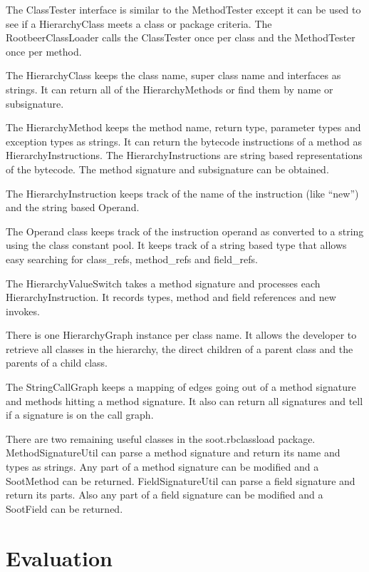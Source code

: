 \documentclass[preprint]{sigplanconf}
\begin{document}
The ClassTester interface is similar to the MethodTester except it can be used to see if a HierarchyClass meets a class or package criteria. The RootbeerClassLoader calls the ClassTester once per class and the MethodTester once per method.

The HierarchyClass keeps the class name, super class name and interfaces as strings. It can return all of the HierarchyMethods or find them by name or subsignature.

The HierarchyMethod keeps the method name, return type, parameter types and exception types as strings. It can return the bytecode instructions of a method as HierarchyInstructions. The HierarchyInstructions are string based representations of the bytecode. The method signature and subsignature can be obtained.

The HierarchyInstruction keeps track of the name of the instruction (like “new”) and the string based Operand.

The Operand class keeps track of the instruction operand as converted to a string using the class constant pool. It keeps track of a string based type that allows easy searching for class\_refs, method\_refs and field\_refs.

The HierarchyValueSwitch takes a method signature and processes each HierarchyInstruction. It records types, method and field references and new invokes.

There is one HierarchyGraph instance per class name. It allows the developer to retrieve all classes in the hierarchy, the direct children of a parent class and the parents of a child class. 


The StringCallGraph keeps a mapping of edges going out of a method signature and methods hitting a method signature. It also can return all signatures and tell if a signature is on the call graph.

There are two remaining useful classes in the soot.rbclassload package. MethodSignatureUtil can parse a method signature and return its name and types as strings. Any part of a method signature can be modified and a SootMethod can be returned. FieldSignatureUtil can parse a field signature and return its parts. Also any part of a field signature can be modified and a SootField can be returned.

\section{Evaluation}
\label{sec:eval}
\end{document}
